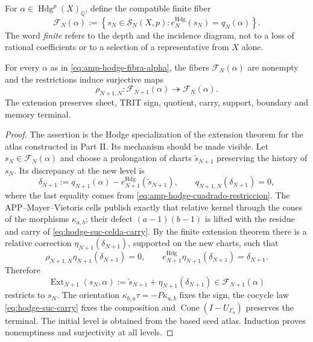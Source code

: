 For \(\alpha\in\operatorname{Hdg}^p(X)_{\mathbb Q}\), define the compatible finite
fiber
\begin{equation}\label{eq:amp-hodge-fibra-alpha}
 \mathscr F_N(\alpha):=
 \left\{s_N\in\mathscr S_N(X,p):
 e_N^{\mathrm{Hdg}}(s_N)=q_N(\alpha)\right\}.
\end{equation}
The word \emph{finite} refers to the depth and the incidence
diagram, not to a loss of rational coefficients or to a selection
of a representative from \(X\) alone.

\begin{proposition}
\label{prop:amp-hodge-extension-finita}
For every \(\alpha\) as in \eqref{eq:amp-hodge-fibra-alpha}, the fibers
\(\mathscr F_N(\alpha)\) are nonempty and the restrictions induce surjective
maps
\begin{equation}\label{eq:amp-hodge-mittag-leffler}
 \rho_{N+1,N}:\mathscr F_{N+1}(\alpha)\twoheadrightarrow
 \mathscr F_N(\alpha).
\end{equation}
The extension preserves sheet, TRIT sign, quotient, carry, support, boundary and
memory terminal.
\end{proposition}

\begin{proof}
The assertion is the Hodge specialization of the extension theorem for the atlas
constructed in Part II. Its mechanism should be made visible. Let
\(s_N\in\mathscr F_N(\alpha)\) and choose a prolongation of charts
\(\widetilde s_{N+1}\) preserving the history of \(s_N\). Its discrepancy at
the new level is
\begin{equation}\label{eq:amp-hodge-discrepancia}
 \delta_{N+1}:=q_{N+1}(\alpha)
 -e_{N+1}^{\mathrm{Hdg}}(\widetilde s_{N+1}),
 \qquad q_{N+1,N}(\delta_{N+1})=0,
\end{equation}
where the last equality comes from
\eqref{eq:amp-hodge-cuadrado-restriccion}. The
APP--Mayer--Vietoris cells publish exactly that relative kernel through the
cones of the morphisms \(\kappa_{a,b}\); their defect
\((a-1)(b-1)\) is lifted with the residue and carry of
\eqref{eq:hodge-suc-celda-carry}. By the finite extension theorem there is a
relative correction \(\eta_{N+1}(\delta_{N+1})\), supported on the new
charts, such that
\begin{equation}\label{eq:amp-hodge-extension-operativa}
 \rho_{N+1,N}\eta_{N+1}(\delta_{N+1})=0,
 \qquad
 e_{N+1}^{\mathrm{Hdg}}\eta_{N+1}(\delta_{N+1})=\delta_{N+1}.
\end{equation}
Therefore
\begin{equation}\label{eq:amp-hodge-ext}
 \operatorname{Ext}_{N+1}(s_N,\alpha):=
 \widetilde s_{N+1}+\eta_{N+1}(\delta_{N+1})
 \in\mathscr F_{N+1}(\alpha)
\end{equation}
restricts to \(s_N\). The orientation
\(\kappa_{b,a}\tau=-P\kappa_{a,b}\) fixes the sign, the cocycle law
\eqref{eq:hodge-suc-carry} fixes the composition and
\(\operatorname{Cone}(I-U_{\Gamma_9})\) preserves the terminal. The initial level
is obtained from the based seed atlas. Induction proves nonemptiness and
surjectivity at all levels.
\end{proof}

